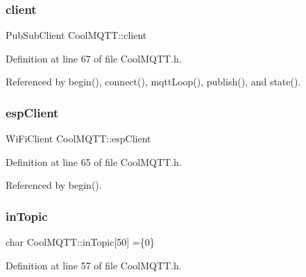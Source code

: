 \mbox{\label{classCoolMQTT_a4ca71e4f76ef868692a297efd45b1415}} 
\subsubsection{\texorpdfstring{client}{client}}
{\footnotesize\ttfamily Pub\+Sub\+Client Cool\+M\+Q\+T\+T\+::client\hspace{0.3cm}{\ttfamily [private]}}



Definition at line 67 of file Cool\+M\+Q\+T\+T.\+h.



Referenced by begin(), connect(), mqtt\+Loop(), publish(), and state().

\mbox{\label{classCoolMQTT_acc30a0200967374a524092a8a806502a}} 
\subsubsection{\texorpdfstring{esp\+Client}{espClient}}
{\footnotesize\ttfamily Wi\+Fi\+Client Cool\+M\+Q\+T\+T\+::esp\+Client\hspace{0.3cm}{\ttfamily [private]}}



Definition at line 65 of file Cool\+M\+Q\+T\+T.\+h.



Referenced by begin().

\mbox{\label{classCoolMQTT_a4492f52a441e83cc5151010317fdb52d}} 
\subsubsection{\texorpdfstring{in\+Topic}{inTopic}}
{\footnotesize\ttfamily char Cool\+M\+Q\+T\+T\+::in\+Topic\mbox{[}50\mbox{]} =\{\textquotesingle{}0\textquotesingle{}\}\hspace{0.3cm}{\ttfamily [private]}}



Definition at line 57 of file Cool\+M\+Q\+T\+T.\+h.



